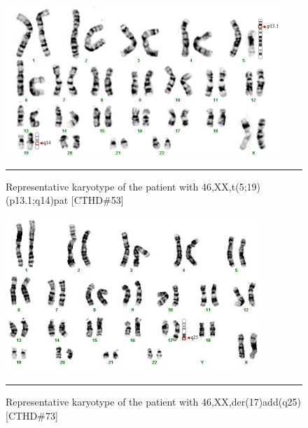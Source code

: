 \begin{refsection}
\begin{figure}[!thbp]
\centering
\includegraphics[width=\linewidth]{Figures/Figure3_1.pdf}
\rule{35em}{0.5pt}
\caption[Representative karyotype (CTHD\#53)]{Representative karyotype of the patient with 46,XX,t(5;19)(p13.1;q14)pat [CTHD\#53]}
\label{fig:KT3.1}
\end{figure}

\begin{figure}[!thbp]
\centering
\includegraphics[width=\linewidth]{Figures/Figure3_2.pdf}
\rule{35em}{0.5pt}
\caption[Representative karyotype (CTHD\#73)]{Representative karyotype of the patient with 46,XX,der(17)add(q25) [CTHD\#73]}
\label{fig:KT3.2}
\end{figure}


\end{refsection}
